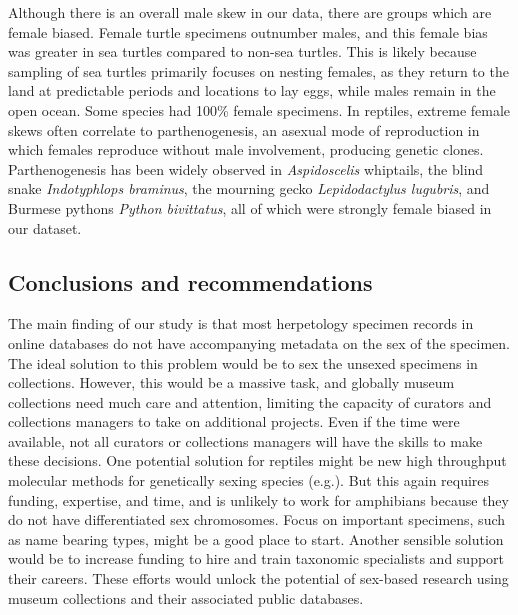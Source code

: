 \documentclass[a4paper, 12pt]{article}
\begin{document}
Although there is an overall male skew in our data, there are groups which are female biased.
Female turtle specimens outnumber males, and this female bias was greater in sea turtles compared to non-sea turtles.
This is likely because sampling of sea turtles primarily focuses on nesting females, as they return to the land at predictable periods and locations to lay eggs\cite{pike2013climate}, while males remain in the open ocean\cite{cuevas2020first}.
Some species had 100\% female specimens. 
In reptiles, extreme female skews often correlate to parthenogenesis, an asexual mode of reproduction in which females reproduce without male involvement, producing genetic clones\cite{booth2016emerging}. 
Parthenogenesis has been widely observed in \textit{Aspidoscelis} whiptails\cite{barley2019complex}, the blind snake \textit{Indotyphlops braminus}\cite{allen2018molecular}, the mourning gecko \textit{Lepidodactylus lugubris}\cite{griffing2019embryonic}, and Burmese pythons \textit{Python bivittatus}\cite{booth2014new}, all of which were strongly female biased in our dataset. 

\subsection{Conclusions and recommendations}

The main finding of our study is that most herpetology specimen records in online databases do not have accompanying metadata on the sex of the specimen. The ideal solution to this problem would be to sex the unsexed specimens in collections. 
However, this would be a massive task, and globally museum collections need much care and attention, limiting the capacity of curators and collections managers to take on additional projects. 
Even if the time were available, not all curators or collections managers will have the skills to make these decisions. One potential solution for reptiles might be new high throughput molecular methods for genetically sexing species (e.g.\cite{rovatsos2017molecular}).
But this again requires funding, expertise, and time, and is unlikely to work for amphibians because they do not have differentiated sex chromosomes. 
Focus on important specimens, such as name bearing types, might be a good place to start.
Another sensible solution would be to increase funding to hire and train taxonomic specialists and support their careers.
These efforts would unlock the potential of sex-based research using museum collections and their associated public databases.
\end{document}
